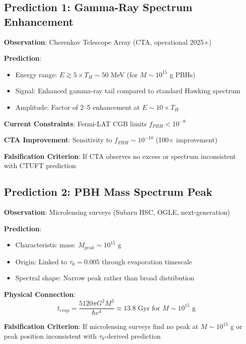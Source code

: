 \subsection{Prediction 1: Gamma-Ray Spectrum Enhancement}
\label{subsec:prediction-gamma}

\textbf{Observation}: Cherenkov Telescope Array (CTA, operational 2025+)

\textbf{Prediction}: 
\begin{itemize}
    \item Energy range: $E \gtrsim 5 \times T_H \sim 50$ MeV (for $M \sim 10^{15}$ g PBHs)
    \item Signal: Enhanced gamma-ray tail compared to standard Hawking spectrum
    \item Amplitude: Factor of 2--5 enhancement at $E \sim 10 \times T_H$
\end{itemize}

\textbf{Current Constraints}: Fermi-LAT CGB limits $f_{PBH} < 10^{-8}$

\textbf{CTA Improvement}: Sensitivity to $f_{PBH} \sim 10^{-10}$ (100$\times$ improvement)

\textbf{Falsification Criterion}: If CTA observes no excess or spectrum inconsistent with CTUFT prediction

\subsection{Prediction 2: PBH Mass Spectrum Peak}
\label{subsec:prediction-mass}

\textbf{Observation}: Microlensing surveys (Subaru HSC, OGLE, next-generation)

\textbf{Prediction}:
\begin{itemize}
    \item Characteristic mass: $M_{peak} \sim 10^{15}$ g
    \item Origin: Linked to $\tau_0 = 0.005$ through evaporation timescale
    \item Spectral shape: Narrow peak rather than broad distribution
\end{itemize}

\textbf{Physical Connection}:
\begin{equation}
t_{evap} = \frac{5120\pi G^2 M^3}{\hbar c^4} \approx 13.8 \text{ Gyr for } M \sim 10^{15} \text{ g}
\label{eq:evaporation-time}
\end{equation}

\textbf{Falsification Criterion}: If microlensing surveys find no peak at $M \sim 10^{15}$ g or peak position inconsistent with $\tau_0$-derived prediction

